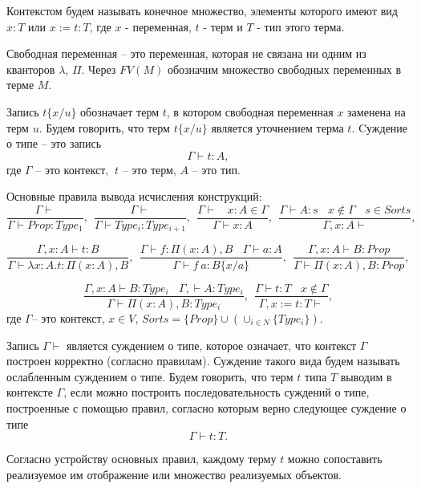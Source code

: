 \documentclass[12pt]{article}
\begin{document}
Контекстом будем называть конечное множество, элементы которого имеют вид $x : T$ или $x := t : T$, где $x$ - переменная, $t$ - терм и $T$ - тип этого терма.

Свободная переменная -- это переменная, которая не связана ни одним из кванторов $\lambda$, $\Pi$. Через $FV(M)$ обозначим множество свободных переменных в терме $M$.

Запись $t\{x/u\}$ обозначает терм $t$, в котором свободная переменная $x$ заменена на терм $u$. Будем говорить, что терм $t\{x/u\}$ является уточнением терма $t$. Cуждение о типе -- это запись 
$$\Gamma \vdash t: A,$$ 
где $\Gamma$ -- это контекст, $\ t$ -- это терм,  $A$ -- это тип. 

Основные правила вывода исчисления конструкций:
$$\frac{\Gamma \vdash }
        {\Gamma \vdash Prop: Type_1}, \ \  
\frac{\Gamma \vdash }
    {\Gamma \vdash Type_i: Type_{i+1}}, \ \ 
\frac{\Gamma \vdash \ \ \ \ x:A \in \Gamma}
        {\Gamma \vdash x:A},\ \ 
\frac{\Gamma \vdash A:s \ \ \ \ x \notin \Gamma \ \ \ \  s\in Sorts}
{\Gamma, x:A \vdash },$$
        
$$\frac{\Gamma, x:A \vdash t:B}
        {\Gamma \vdash \lambda x:A.t:\Pi (x:A), B},\ \ 
    \frac{\Gamma \vdash f:\Pi (x:A), B \ \ \ \  \Gamma \vdash a: A}
        {\Gamma \vdash f\ a:B\{x/a\}},\ \ 
        \frac{\Gamma, x:A \vdash B:Prop} 
        {\Gamma \vdash \Pi (x:A), B:Prop},$$

$$\frac{\Gamma, x:A \vdash B:Type_i \ \ \ \  \Gamma, \vdash A:Type_i}
        {\Gamma \vdash \Pi (x:A), B:Type_i},\ \ 
    \frac{\Gamma \vdash t: T \ \ \ \ x \notin \Gamma}
        {\Gamma, x:=t:T \vdash },$$
где  $\Gamma$-- это контекст, $x \in V$, $Sorts=\{Prop\} \cup (\cup_{i \in N} \{Type_i\}).$

Запись $\Gamma \vdash$ является суждением о типе, которое означает, что контекст $\Gamma$ построен корректно (согласно правилам). Суждение такого вида будем называть ослабленным суждением о типе.
Будем говорить, что терм $t$ типа $T$ выводим в контексте $\Gamma$, если можно построить последовательность суждений о типе, построенные с помощью правил, согласно которым верно следующее суждение о типе
$$\Gamma \vdash t: T.$$

Согласно устройству основных правил, каждому терму $t$ можно сопоставить реализуемое им отображение или множество реализуемых объектов.
\end{document}
